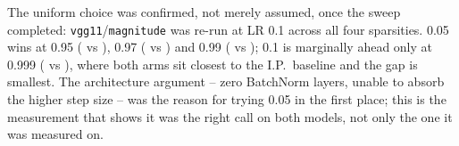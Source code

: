 The uniform choice was confirmed, not merely assumed, once the sweep completed:
\texttt{vgg11}/\texttt{magnitude} was re-run at LR 0.1 across all four
sparsities. 0.05 wins at 0.95
( vs ),
0.97 ( vs
) and 0.99
( vs );
0.1 is marginally ahead only at 0.999
( vs ),
where both arms sit closest to the I.P.\ baseline and the gap is smallest. The
architecture argument -- zero BatchNorm layers, unable to absorb the higher
step size -- was the reason for trying 0.05 in the first place; this is the
measurement that shows it was the right call on both models, not only the one
it was measured on.
